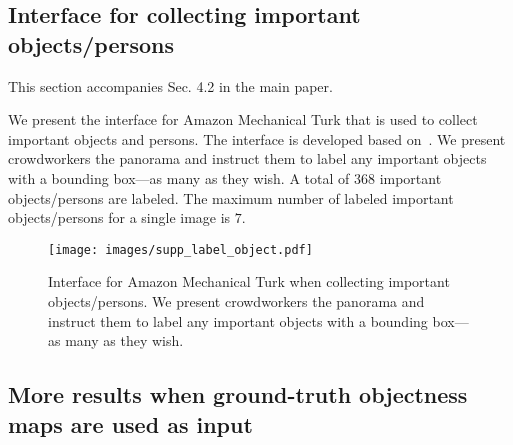 \clearpage

\subsection{Interface for collecting important objects/persons}
 
This section accompanies Sec. 4.2 in the main paper.

We present the interface for Amazon Mechanical Turk that is used to collect important objects and persons. The interface is developed based on~\cite{profx}. We present crowdworkers the panorama and instruct them to label any important objects with a bounding box---as many as they wish. A total of $368$ important objects/persons are labeled. The maximum number of labeled important objects/persons for a single image is $7$.


\begin{figure*}[t]
\centering
\renewcommand{\tabcolsep}{0pt}
\texttt{[image: images/supp\_label\_object.pdf]}%
\caption{Interface for Amazon Mechanical Turk when collecting important objects/persons.
We present crowdworkers the panorama and instruct them to label any important objects with a bounding box---as many as they wish.}
\label{fig:supp_important}
\end{figure*}




\subsection{More results when ground-truth objectness maps are used as input}



  
 
 
